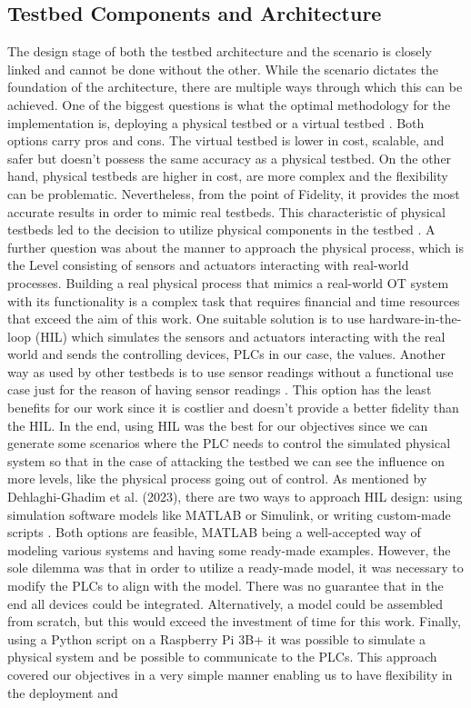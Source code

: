 \documentclass[Master,BMR,english]{twbook}
\begin{document}
\subsection{Testbed Components and Architecture}

The design stage of both the testbed architecture and the scenario is closely linked and cannot be done without the other. While the scenario dictates the foundation of the architecture, there are multiple ways through which this can be achieved. One of the biggest questions is what the optimal methodology for the implementation is, deploying a physical testbed or a virtual testbed \cite{dehlaghi-ghadim_icssim-framework_2023}. Both options carry pros and cons. The virtual testbed is lower in cost, scalable, and safer but doesn’t possess the same accuracy as a physical testbed. On the other hand, physical testbeds are higher in cost, are more complex and the flexibility can be problematic. Nevertheless, from the point of Fidelity, it provides the most accurate results in order to mimic real testbeds. This characteristic of physical testbeds led to the decision to utilize physical components in the testbed \cite{buchegger_secure_2015}. A further question was about the manner to approach the physical process, which is the Level consisting of sensors and actuators interacting with real-world processes. Building a real physical process that mimics a real-world OT system with its functionality is a complex task that requires financial and time resources that exceed the aim of this work. One suitable solution is to use hardware-in-the-loop (HIL) which simulates the sensors and actuators interacting with the real world and sends the controlling devices, PLCs in our case, the values\cite{ani_design_2021}. Another way as used by other testbeds is to use sensor readings without a functional use case just for the reason of having sensor readings \cite{pospisil_application_2021}. This option has the least benefits for our work since it is costlier and doesn’t provide a better fidelity than the HIL. In the end, using HIL was the best for our objectives since we can generate some scenarios where the PLC needs to control the simulated physical system so that in the case of attacking the testbed we can see the influence on more levels, like the physical process going out of control. As mentioned by Dehlaghi-Ghadim et al. (2023), there are two ways to approach HIL design: using simulation software models like MATLAB or Simulink, or writing custom-made scripts \cite{dehlaghi-ghadim_icssim-framework_2023}. Both options are feasible, MATLAB being a well-accepted way of modeling various systems and having some ready-made examples\cite{matlab_software}. However, the sole dilemma was that in order to utilize a ready-made model, it was necessary to modify the PLCs to align with the model. There was no guarantee that in the end all devices could be integrated. Alternatively, a model could be assembled from scratch, but this would exceed the investment of time for this work. Finally, using a Python script on a Raspberry Pi 3B+ it was possible to simulate a physical system and be possible to communicate to the PLCs. This approach covered our objectives in a very simple manner enabling us to have flexibility in the deployment and 
\end{document}
